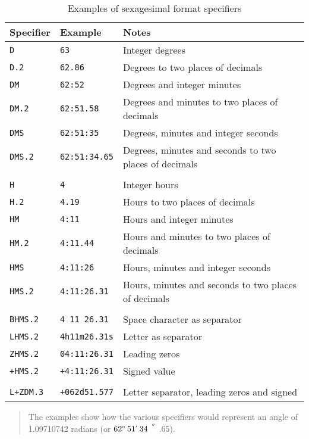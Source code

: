 \documentclass[twoside,11pt]{article}
\newcommand{\arcsec} {$\hspace{-0.05em}\raisebox{-0.5ex}
                     {$^{'\hspace{-0.1em}'}$}
                     \hspace{-0.7em}.\hspace{-0.05em}$}
\newcommand{\dms}[4] {$#1^{\circ}\,#2\raisebox{-0.5ex}{$^{'}$}\,#3\arcsec#4$}
\renewcommand{\_}{\texttt{\symbol{95}}}
\begin{document}
\begin{table}[htbp]

\begin{center}
\begin{tabular}{lll}
Specifier     & Example            & Notes          \\ \hline
{\tt D}       & {\tt 63}          & Integer degrees \\
{\tt D.2}     & {\tt 62.86}       & Degrees to two places of decimals \\
{\tt DM}      & {\tt 62:52}       & Degrees and integer minutes \\
{\tt DM.2}    & {\tt 62:51.58}    & Degrees and minutes to two places of decimals \\
{\tt DMS}     & {\tt 62:51:35}    & Degrees, minutes and integer seconds \\
{\tt DMS.2}   & {\tt 62:51:34.65} & Degrees, minutes and seconds to two places of decimals \\
              &                    & \\
{\tt H}       & {\tt 4}            & Integer hours \\
{\tt H.2}     & {\tt 4.19}         & Hours to two places of decimals \\
{\tt HM}      & {\tt 4:11}         & Hours and integer minutes \\
{\tt HM.2}    & {\tt 4:11.44}      & Hours and minutes to two places of decimals \\
{\tt HMS}     & {\tt 4:11:26}      & Hours, minutes and integer seconds \\
{\tt HMS.2}   & {\tt 4:11:26.31}   & Hours, minutes and seconds to two places of decimals \\
              &                    & \\
{\tt BHMS.2}  & {\tt 4 11 26.31}   & Space character as separator \\
{\tt LHMS.2}  & {\tt 4h11m26.31s}  & Letter as separator \\
{\tt ZHMS.2}  & {\tt 04:11:26.31}  & Leading zeros \\
{\tt +HMS.2}  & {\tt +4:11:26.31}  & Signed value \\
              &                    & \\
{\tt L+ZDM.3} & {\tt +062d51.577}  & Letter separator, leading zeros and signed \\
\end{tabular}

\begin{quote}
The examples show how the various specifiers would represent an angle of
1.09710742 radians (or \dms{62}{51}{34}{65}).
\end{quote}

\caption{\label{SEXAG_EXAM}Examples of sexagesimal format specifiers}
\end{center}

\end{table}
\end{document}
